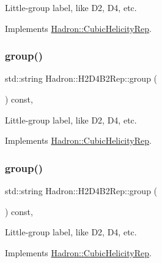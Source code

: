 Little-\/group label, like D2, D4, etc. 

Implements \mbox{\hyperlink{structHadron_1_1CubicHelicityRep_a101a7d76cd8ccdad0f272db44b766113}{Hadron\+::\+Cubic\+Helicity\+Rep}}.

\mbox{\label{structHadron_1_1H2D4B2Rep_a48ee68e2c92450c822756a18a840be70}} 
\subsubsection{\texorpdfstring{group()}{group()}\hspace{0.1cm}{\footnotesize\ttfamily [3/5]}}
{\footnotesize\ttfamily std\+::string Hadron\+::\+H2\+D4\+B2\+Rep\+::group (\begin{DoxyParamCaption}{ }\end{DoxyParamCaption}) const\hspace{0.3cm}{\ttfamily [inline]}, {\ttfamily [virtual]}}

Little-\/group label, like D2, D4, etc. 

Implements \mbox{\hyperlink{structHadron_1_1CubicHelicityRep_a101a7d76cd8ccdad0f272db44b766113}{Hadron\+::\+Cubic\+Helicity\+Rep}}.

\mbox{\label{structHadron_1_1H2D4B2Rep_a48ee68e2c92450c822756a18a840be70}} 
\subsubsection{\texorpdfstring{group()}{group()}\hspace{0.1cm}{\footnotesize\ttfamily [4/5]}}
{\footnotesize\ttfamily std\+::string Hadron\+::\+H2\+D4\+B2\+Rep\+::group (\begin{DoxyParamCaption}{ }\end{DoxyParamCaption}) const\hspace{0.3cm}{\ttfamily [inline]}, {\ttfamily [virtual]}}

Little-\/group label, like D2, D4, etc. 

Implements \mbox{\hyperlink{structHadron_1_1CubicHelicityRep_a101a7d76cd8ccdad0f272db44b766113}{Hadron\+::\+Cubic\+Helicity\+Rep}}.

\mbox{\label{structHadron_1_1H2D4B2Rep_a48ee68e2c92450c822756a18a840be70}} 
